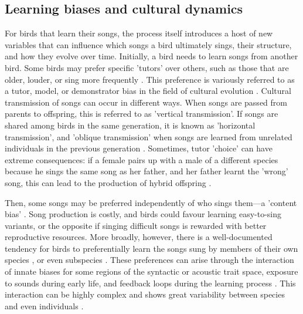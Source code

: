 \subsection{Learning biases and cultural dynamics}
For birds that learn their songs, the process itself introduces a host of new variables that can influence which songs a bird ultimately sings, their structure, and how they evolve over time. Initially, a bird needs to learn songs from another bird. Some birds may prefer specific 'tutors' over others, such as those that are older, louder, or sing more frequently \autocite{Greig2012}. This preference is variously referred to as a tutor, model, or demonstrator bias in the field of cultural evolution \autocite{kendal2015,VanDeWaal2010}. Cultural transmission of songs can occur in different ways. When songs are passed from parents to offspring, this is referred to as 'vertical transmission'. If songs are shared among birds in the same generation, it is known as 'horizontal transmission', and 'oblique transmission' when songs are learned from unrelated individuals in the previous generation \autocite{cavalli-sforza1982,ram2018}. Sometimes, tutor 'choice’ can have extreme consequences: if a female pairs up with a male of a different species because he sings the same song as her father, and her father learnt the 'wrong’ song, this can lead to the production of hybrid offspring \autocite{grant1997,grant1997a}.

Then, some songs may be preferred independently of who sings them---a 'content bias’ \autocite{Richerson2005}. Song production is costly, and birds could favour learning easy-to-sing variants, or the opposite if singing difficult songs is rewarded with better reproductive resources. More broadly, however, there is a well-documented tendency for birds to preferentially learn the songs sung by members of their own species \autocite{slabbekoorn2002}, or even subspecies \autocite{nelson2000}. These preferences can arise through the interaction of innate biases for some regions of the syntactic or acoustic trait space, exposure to sounds during early life, and feedback loops during the learning process \autocite{feher2009,Feher2017,verzijden2012}. This interaction can be highly complex and shows great variability between species and even individuals \autocite{james2020,mets2017,mets2019,tencate2007}. 

